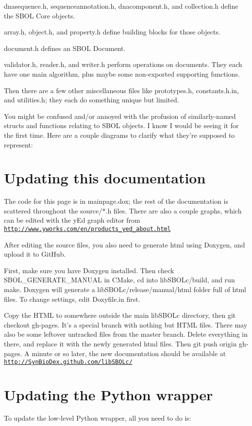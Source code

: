 \begin{DoxyItemize}
\item dnasequence.\+h, sequenceannotation.\+h, dnacomponent.\+h, and collection.\+h define the S\+B\+O\+L Core objects.
\item array.\+h, object.\+h, and property.\+h define building blocks for those objects.
\item document.\+h defines an S\+B\+O\+L Document.
\item validator.\+h, reader.\+h, and writer.\+h perform operations on documents. They each have one main algorithm, plus maybe some non-\/exported supporting functions.
\item Then there are a few other miscellaneous files like prototypes.\+h, constants.\+h.\+in, and utilities.\+h; they each do something unique but limited.
\end{DoxyItemize}

You might be confused and/or annoyed with the profusion of similarly-\/named structs and functions relating to S\+B\+O\+L objects. I know I would be seeing it for the first time. Here are a couple diagrams to clarify what they're supposed to represent\+:



\hypertarget{index_doxygen}{}\section{Updating this documentation}\label{index_doxygen}
The code for this page is in mainpage.\+dox; the rest of the documentation is scattered throughout the source/$\ast$.h files. There are also a couple graphs, which can be edited with the y\+Ed graph editor from \href{http://www.yworks.com/en/products_yed_about.html}{\tt http\+://www.\+yworks.\+com/en/products\+\_\+yed\+\_\+about.\+html}

After editing the source files, you also need to generate html using Doxygen, and upload it to Git\+Hub.

First, make sure you have Doxygen installed. Then check {\ttfamily S\+B\+O\+L\+\_\+\+G\+E\+N\+E\+R\+A\+T\+E\+\_\+\+M\+A\+N\+U\+A\+L} in C\+Make, {\ttfamily cd} into {\ttfamily lib\+S\+B\+O\+Lc/build}, and run {\ttfamily make}. Doxygen will generate a {\ttfamily lib\+S\+B\+O\+Lc/release/manual/html} folder full of html files. To change settings, edit Doxyfile.\+in first.

Copy the H\+T\+M\+L to somewhere outside the main lib\+S\+B\+O\+Lc directory, then {\ttfamily git checkout gh-\/pages}. It's a special branch with nothing but H\+T\+M\+L files. There may also be some leftover untracked files from the master branch. Delete everything in there, and replace it with the newly generated html files. Then {\ttfamily git push origin gh-\/pages}. A minute or so later, the new documentation should be available at \href{http://SynBioDex.github.com/libSBOLc/}{\tt http\+://\+Syn\+Bio\+Dex.\+github.\+com/lib\+S\+B\+O\+Lc/}\hypertarget{index_swig}{}\section{Updating the Python wrapper}\label{index_swig}
To update the low-\/level Python wrapper, all you need to do is\+:


